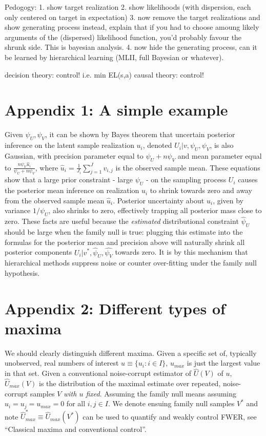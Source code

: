 \documentclass{article}
\begin{document}
Pedogogy: 
1. show target realization
2. show likelihoods (with dispersion, each only centered on target in expectation)
3. now remove the target realizations and show generating process instead, explain that if you had to choose amoung likely arguments of the (dispersed) likelihood function, you'd probably favour the shrunk side. This is bayesian analysis.
4. now hide the generating process, can it be learned by hierarchical learning (MLII, full Bayesian or whatever).

decision theory: control! i.e. min EL(s,a)
causal theory: control!

\section{Appendix 1: A simple example}
Given $\psi_U,\psi_V$, it can be shown by Bayes theorem that uncertain posterior inference on the latent sample realization $u_i$, denoted $U_i|v,\psi_U,\psi_V$, is also Gaussian, with precision parameter equal to $\psi_U+n\psi_V$ and mean parameter equal to $\frac{n\psi_V \hat{u}_i}{\psi_U+n\psi_V}$, where $\hat{u}_i = \frac{1}{J_i}\sum_{j=1}^J v_{i,j}$ is the observed sample mean. These equations show that a large prior constraint - large $\psi_U$ - on the sampling process $U_i$ causes the posterior mean inference on realization $u_i$ to shrink towards zero and away from the observed sample mean $\hat{u}_i$. Posterior uncertainty about $u_i$, given by variance $1/\psi_U$, also shrinks to zero, effectively trapping all posterior mass close to zero. These facts are useful because the \textit{estimated} distributional constraint $\hat{\psi}_U$ should be large when the family null is true: plugging this estimate into the formulas for the posterior mean and precision above will naturally shrink all posterior components $U_i|v^*, \hat{\psi}_U, \hat{\psi_V}$ towards zero. It is by this mechanism that hierarchical methods suppress noise or counter over-fitting under the family null hypothesis. 



\section{Appendix 2: Different types of maxima}

We should clearly distinguish different maxima. Given a specific set of, typically unobserved, real numbers of interest $u \equiv \{u_i: i \in I \}$, $u_{max}$ is just the largest value in that set. Given a conventional noise-corrupt estimator of $\hat{U}(V)$ of $u$, $\hat{U}_{max}(V)$ is the distribution of the maximal estimate over repeated, noise-corrupt samples $V$ \textit{with $u$ fixed}. Assuming the family null means assuming $u_i=u_j=u_{max}=0$ for all $i,j \in I$. We denote ensuing family null samples $V^*$ and note $\hat{U}_{max}^* \equiv \hat{U}_{max}(V^*)$ can be used to quantify and weakly control FWER, see ``Classical maxima and conventional control''. 
\end{document}
